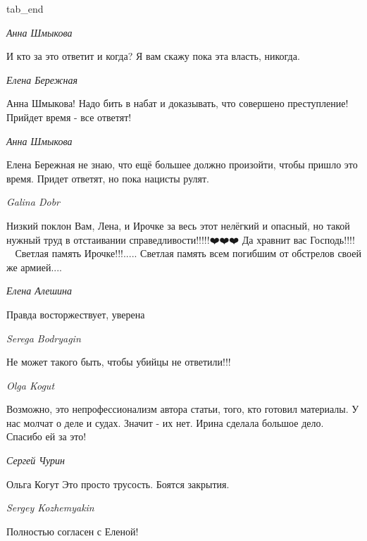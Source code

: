   tab_end
\fi

\emph{Анна Шмыкова}

И кто за это ответит и когда? Я вам скажу пока эта власть, никогда.

\emph{Елена Бережная}

Анна Шмыкова! Надо бить в набат и доказывать, что совершено преступление!
Прийдет время - все ответят!

\emph{Анна Шмыкова}

Елена Бережная не знаю, что ещё большее должно произойти, чтобы пришло это время. Придет ответят, но пока нацисты рулят.

\emph{Galina Dobr}

Низкий поклон Вам, Лена, и Ирочке за весь этот нелёгкий и опасный, но такой нужный труд в отстаивании справедливости!!!!!❤️❤️❤️
Да хравнит вас Господь!!!! 🙏🙏🙏
Светлая память Ирочке!!!.....
Светлая память всем погибшим от обстрелов своей же армией....

\emph{Елена Алешина}

Правда восторжествует, уверена

\emph{Serega Bodryagin}

Не может такого быть, чтобы убийцы не ответили!!!

\emph{Olga Kogut}

Возможно, это непрофессионализм автора статьи, того, кто готовил материалы. У
нас молчат о деле и судах. Значит - их нет. Ирина сделала большое дело. Спасибо
ей за это!

\emph{Сергей Чурин}

Ольга Когут Это просто трусость. Боятся закрытия.

\emph{Sergey Kozhemyakin}

Полностью согласен с Еленой!

